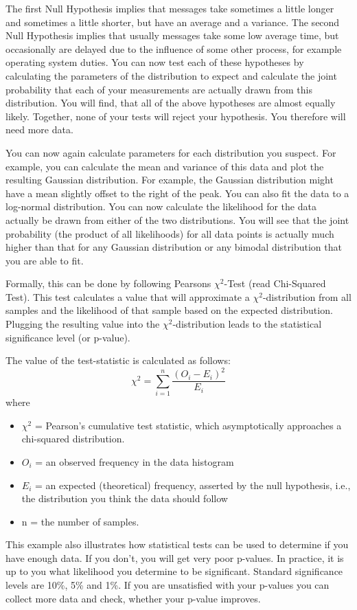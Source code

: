 The first Null Hypothesis implies that messages take sometimes a little longer and sometimes a little shorter, but have an average and a variance. The second Null Hypothesis implies that usually messages take some low average time, but occasionally are delayed due to the influence of some other process, for example operating system duties. You can now test each of these hypotheses by calculating the parameters of the distribution to expect and calculate the joint probability that each of your measurements are actually drawn from this distribution. You will find, that all of the above hypotheses are almost equally likely. Together, none of your tests will reject your hypothesis. You therefore will need more data.

You can now again calculate parameters for each distribution you suspect. For example, you can calculate the mean and variance of this data and plot the resulting Gaussian distribution. For example, the Gaussian distribution might have a mean slightly offset to the right of the peak. You can also fit the data to a log-normal distribution. You can now calculate the likelihood for the data actually be drawn from either of the two distributions. You will see that the joint probability (the product of all likelihoods) for all data points is actually much higher than that for any Gaussian distribution or any bimodal distribution that you are able to fit.

Formally, this can be done by following Pearsons $ \chi^2$-Test (read Chi-Squared Test). This test calculates a value that will approximate a $ \chi^2$-distribution from all samples and the likelihood of that sample based on the expected distribution. Plugging the resulting value into the $ \chi^2$-distribution leads to the statistical significance level (or p-value).

The value of the test-statistic is calculated as follows:
\begin{equation}
\chi^2 = \sum_{i=1}^{n} \frac{(O_i - E_i)^2}{E_i}
\end{equation}
where
\begin{itemize}
\item $ \chi^2$ = Pearson's cumulative test statistic, which asymptotically approaches a chi-squared distribution.
\item $ O_i$ = an observed frequency in the data histogram
\item $ E_i$ = an expected (theoretical) frequency, asserted by the null hypothesis, i.e., the distribution you think the data should follow
\item n = the number of samples.
\end{itemize}
This example also illustrates how statistical tests can be used to determine if you have enough data. If you don't, you will get very poor p-values.  In practice, it is up to you what likelihood you determine to be significant. Standard significance levels are 10\%, 5\% and 1\%. If you are unsatisfied with your p-values you can collect more data and check, whether your p-value improves.

